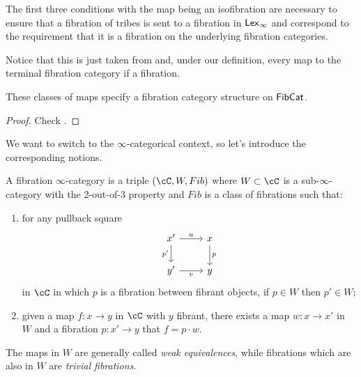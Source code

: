 \documentclass[a4paper,12pt,openany]{scrartcl}
\begin{document}
The first three conditions with the map being an isofibration are necessary to
ensure that a fibration of tribes is sent to a fibration in $\operatorname{\mathsf{Lex}_\infty}$ and
correspond to the requirement that it is a fibration on the underlying fibration
categories.

Notice that this is just taken from \cite[Def.\ 4.3]{KS19} and, under our
definition, every map to the terminal fibration category if a fibration.

\begin{prop}
  These classes of maps specify a fibration category structure on $\operatorname{\mathsf{FibCat}}$.
\end{prop}
\begin{proof}
  Check \cite{KS19}.
\end{proof}

We want to switch to the $\infty$-categorical context, so let's introduce the
corresponding notions.

\begin{defn}
  A fibration $\infty$-category is a triple $(\cC,W,Fib)$ where $W\subset\cC$
  is a sub-$\infty$-category with the 2-out-of-3 property and $Fib$ is a class
  of fibrations such that:
  \begin{enumerate}
    \item for any pullback square
      \[\begin{tikzcd}
        {x'} & x \\
        {y'} & y
        \arrow["p", from=1-2, to=2-2]
        \arrow["{p'}"', from=1-1, to=2-1]
        \arrow["v"', from=2-1, to=2-2]
        \arrow["u", from=1-1, to=1-2]
      \end{tikzcd}\]
      in $\cC$ in which $p$ is a fibration between fibrant objects, if $p\in W$
      then $p'\in W$;
    \item given a map $f\colon x\rightarrow y$ in $\cC$ with $y$ fibrant, there
      exists a map $w\colon x\rightarrow x'$ in $W$ and a fibration $p\colon
      x'\rightarrow y$ that $f=p\cdot w$.
  \end{enumerate}
  The maps in $W$ are generally called \emph{weak equivalences}, while
  fibrations which are also in $W$ are \emph{trivial fibrations}.
\end{defn}
\end{document}
